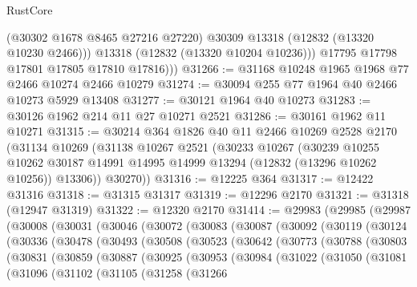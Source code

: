 \begin{lexlean}{RustCore}
\begin{coremodule}
              (@30302 @1678 @8465 @27216 @27220)
              @30309
              @13318
              (@12832 (@13320 @10230 @2466)))
            @13318
            (@12832 (@13320 @10204 @10236)))
          @17795
          @17798
          @17801
          @17805
          @17810
          @17816)))
@31266 := @31168 @10248 @1965 @1968 @77 @2466 @10274 @2466 @10279
@31274 := @30094 @255 @77 @1964 @40 @2466 @10273 @5929 @13408
@31277 := @30121 @1964 @40 @10273
@31283 := @30126 @1962 @214 @11 @27 @10271 @2521
@31286 := @30161 @1962 @11 @10271
@31315 := @30214
    @364
    @1826
    @40
    @11
    @2466
    @10269
    @2528
    @2170
    (@31134
      @10269
      (@31138
        @10267
        @2521
        (@30233
          @10267
          (@30239
            @10255
            @10262
            @30187
            @14991
            @14995
            @14999
            @13294
            (@12832 (@13296 @10262 @10256))
            @13306))
        @30270))
@31316 := @12225 @364
@31317 := @12422 @31316
@31318 := @31315 @31317
@31319 := @12296 @2170
@31321 := @31318 (@12947 @31319)
@31322 := @12320 @2170
@31414 := @29983
    (@29985
      (@29987
        (@30008
          (@30031
            (@30046
              (@30072
                (@30083
                  (@30087
                    (@30092
                      (@30119
                        (@30124
                          (@30336
                            (@30478
                              (@30493
                                (@30508
                                  (@30523
                                    (@30642
                                      (@30773
                                        (@30788
                                          (@30803
                                            (@30831
                                              (@30859
                                                (@30887
                                                  (@30925
                                                    (@30953
                                                      (@30984
                                                        (@31022
                                                          (@31050
                                                            (@31081
                                                              (@31096
                                                                (@31102
                                                                  (@31105
                                                                    (@31258
                                                                      (@31266

\end{coremodule}
\end{lexlean}
